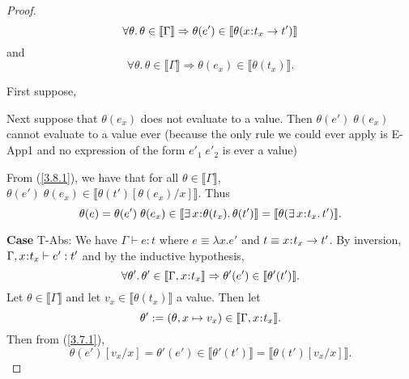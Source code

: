 \documentclass[11pt]{article}
\newcommand{\bind}{\hspace{0.05em}{:}\hspace{0.05em}} %
\newcommand{\lb}{\llbracket}         %
\newcommand{\rb}{\rrbracket}         %
\newcommand{\existype}[3]{\exists\, #1\bind #2.\, #3}
\newcommand{\functype}[3]{#1\bind #2 \rightarrow #3}
\begin{document}
\begin{proof}
\begin{equation}\label{3.8.1}
\forall \theta.\, \theta\in\lb\Gamma\rb \Rightarrow 
\theta(e') \in \lb\theta(\functype{x}{t_x}{t'})\rb\end{equation}
and
\begin{equation}\label{3.8.2}
\forall \theta.\, \theta \in \lb\Gamma\rb \Rightarrow
\theta(e_x) \in \lb\theta(t_x)\rb.
\end{equation}

First suppose,



Next suppose that $\theta(e_x)$ does not evaluate to a value. Then 
$\theta(e')\;\theta(e_x)$ cannot evaluate to a value ever (because the only rule we could ever apply is {\sc E-App1} and no expression of the form $e'_1\;e'_2$ is ever a value)

From (\ref{3.8.1}), we have that for all $\theta \in \lb\Gamma\rb$, $\theta(e')\; \theta(e_x) \in \lb\theta(t')[\theta(e_x)/x]\rb$. Thus
\begin{equation}
\theta(e) = \theta(e')\; \theta(e_x) \in \lb \existype{x}{\theta(t_x)}{\theta(t')}\rb = \lb\theta(\existype{x}{t_x}{t'})\rb
.\end{equation}



{\bf Case} {\sc T-Abs}: We have $\Gamma \vdash e : t$ where $e \equiv \lambda x.e'$ and $t \equiv \functype{x}{t_x}{t'}$. By inversion, $\Gamma,x\bind t_x \vdash e' : t'$ and by the inductive hypothesis,
\begin{equation}\label{3.7.1}
\forall\theta'.\, \theta' \in \lb\Gamma,x\bind t_x\rb \Rightarrow \theta'(e') \in \lb\theta'(t')\rb.\end{equation}
Let $\theta \in \lb\Gamma\rb$ and let $v_x \in \lb \theta(t_x)\rb$ a value. Then let
\[\theta' := (\theta,x\mapsto v_x) \in \lb\Gamma,x\bind t_x\rb.
\] 
Then from (\ref{3.7.1}), 
\begin{equation}\label{3.7.2}
\theta(e')[v_x/x] = \theta'(e') \in \lb\theta'(t')\rb = \lb\theta(t')[v_x/x]\rb.
\end{equation}


\end{proof}
\end{document}
